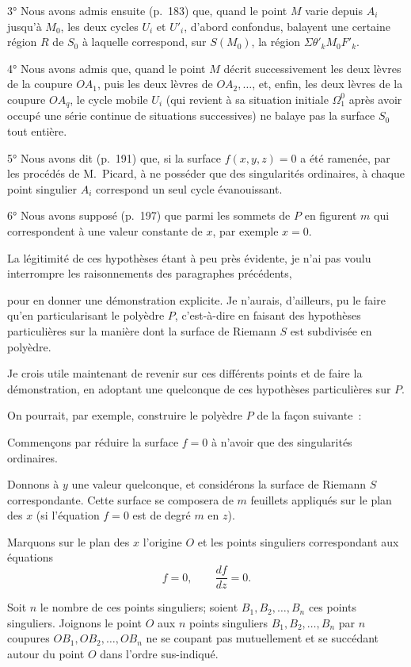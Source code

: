 \documentclass{article}
\begin{document}
3° Nous avons admis ensuite (p.\ 183) que, quand le point $M$ varie depuis $A_{i}$ jusqu'à $M_{0}$, les deux cycles $U_{i}$ et $U'_{i}$, d'abord confondus, balayent une certaine région $R$ de $S_{0}$ à laquelle correspond, sur $S(M_{0})$, la région $\Sigma \theta'_{k} M_{0}F'_{k}$.

4° Nous avons admis que, quand le point $M$ décrit successivement les deux lèvres de la coupure $OA_{1}$, puis les deux lèvres de $OA_{2}, \ldots$, et, enfin, les deux lèvres de la coupure $OA_{q}$, le cycle mobile $U_{i}$ (qui revient à sa situation initiale $\Omega^{0}_{1}$ après avoir occupé une série continue de situations successives) ne balaye pas la surface $S_{0}$ tout entière.

5° Nous avons dit (p.\ 191) que, si la surface $f(x, y, z) = 0$ a été ramenée, par les procédés de M.~Picard, à ne posséder que des singularités ordinaires, à chaque point singulier $A_{i}$ correspond un seul cycle évanouissant.

6° Nous avons supposé (p.\ 197) que parmi les sommets de $P$ en figurent $m$ qui correspondent à une valeur constante de $x$, par exemple $x = 0$.

La légitimité de ces hypothèses étant à peu près évidente, je n'ai pas voulu interrompre les raisonnements des paragraphes précédents,

pour en donner une démonstration explicite. Je n'aurais, d'ailleurs, pu le faire qu'en particularisant le polyèdre $P$, c'est-à-dire en faisant des hypothèses particulières sur la manière dont la surface de Riemann $S$ est subdivisée en polyèdre.

Je crois utile maintenant de revenir sur ces différents points et de faire la démonstration, en adoptant une quelconque de ces hypothèses particulières sur $P$.

On pourrait, par exemple, construire le polyèdre $P$ de la façon suivante~:

Commençons par réduire la surface $f = 0$ à n'avoir que des singularités ordinaires.

Donnons à $y$ une valeur quelconque, et considérons la surface de Riemann $S$ correspondante. Cette surface se composera de $m$ feuillets appliqués sur le plan des $x$ (si l'équation $f = 0$ est de degré $m$ en $z$).

Marquons sur le plan des $x$ l'origine $O$ et les points singuliers correspondant aux équations
\[ f = 0, \qquad \frac{df}{dz} = 0. \]

Soit $n$ le nombre de ces points singuliers; soient $B_{1}, B_{2}, \ldots, B_{n}$ ces points singuliers. Joignons le point $O$ aux $n$ points singuliers $B_{1}, B_{2}, \ldots, B_{n}$ par $n$ coupures $OB_{1}, OB_{2}, \ldots, OB_{n}$ ne se coupant pas mutuellement et se succédant autour du point $O$ dans l'ordre sus-indiqué.
\end{document}
